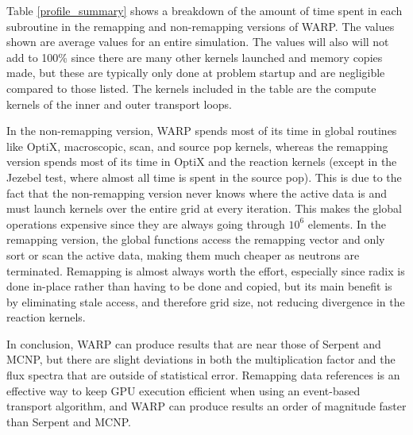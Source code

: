 Table \ref{profile_summary} shows a breakdown of the amount of time spent in each subroutine in the remapping and non-remapping versions of WARP.  The values shown are average values for an entire simulation.  The values will also will not add to 100\% since there are many other kernels launched and memory copies made, but these are typically only done at problem startup and are negligible compared to those listed.  The kernels included in the table are the compute kernels of the inner and outer transport loops.  

In the non-remapping version, WARP spends most of its time in global routines like OptiX, macroscopic, scan, and source pop kernels, whereas the remapping version spends most of its time in OptiX and the reaction kernels (except in the Jezebel test, where almost all time is spent in the source pop).  This is due to the fact that the non-remapping version never knows where the active data is and must launch kernels over the entire grid at every iteration.  This makes the global operations expensive since they are always going through $10^6$ elements.  In the remapping version, the global functions access the remapping vector and only sort or scan the active data, making them much cheaper as neutrons are terminated.  Remapping is almost always worth the effort, especially since radix is done in-place rather than having to be done and copied, but its main benefit is by eliminating stale access, and therefore grid size, not reducing divergence in the reaction kernels.  %



In conclusion, WARP can produce results that are near those of Serpent and MCNP, but there are slight deviations in both the multiplication factor and the flux spectra that are outside of statistical error.  Remapping data references is an effective way to keep GPU execution efficient when using an event-based transport algorithm, and WARP can produce results an order of magnitude faster than Serpent and MCNP.




